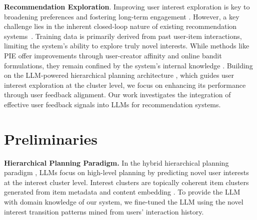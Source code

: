 \documentclass[11pt]{article}
\newcommand{\yl}[1]{{\small\color{orange}{\bf YL: #1}}}
\begin{document}
\smallskip
\noindent\textbf{Recommendation Exploration}. Improving user interest exploration is key to broadening preferences and fostering long-term engagement \cite{chen2021values,chen2021exploration, su2024long}. However, a key challenge lies in the inherent closed-loop nature of existing recommendation systems~\cite{chaney2018algorithmic,mansoury2020feedback,wang2023fresh}. Training data is primarily derived from past user-item interactions, limiting the system's ability to explore truly novel interests. While methods like PIE \cite{mahajan2023pie} offer improvements through user-creator affinity and online bandit formulations, they remain confined by the system's internal knowledge \cite{chen2021values}. Building on the LLM-powered hierarchical planning architecture \cite{wang2024llms}, which guides user interest exploration at the cluster level, we focus on enhancing its performance through user feedback alignment. Our work investigates the integration of effective user feedback signals into LLMs for recommendation systems.


\section{Preliminaries}
\label{sec:preliminary}


\smallskip
\noindent\textbf{Hierarchical Planning Paradigm.} In the hybrid hierarchical planning paradigm \cite{wang2024llms}, LLMs focus on high-level planning by predicting novel user interests at the interest cluster level. Interest clusters are topically coherent item clusters generated from item metadata and content embedding \cite{chang2024cluster}. To provide the LLM with domain knowledge of our system, we fine-tuned the LLM using the novel interest transition patterns mined from users' interaction history. 

\end{document}
